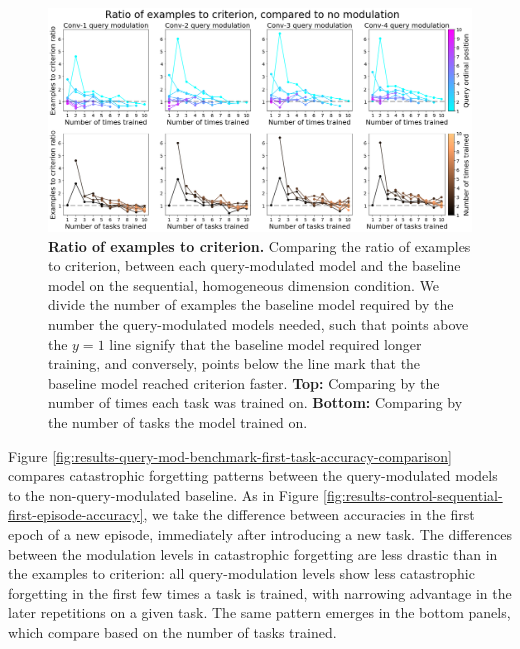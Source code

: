 \begin{figure}[!htb]
\centering
\includegraphics[width=\linewidth]{ch-results/figures/query_mod_benchmark/examples_to_criterion_comparison.png}
\caption[Ratio of examples to criterion.]{ {\bf Ratio of examples to criterion.} Comparing the ratio of examples to criterion, between each query-modulated model and the baseline model on the sequential, homogeneous dimension condition. We divide the number of examples the baseline model required by the number the query-modulated models needed, such that points above the $y=1$ line signify that the baseline model required longer training, and conversely, points below the line mark that the baseline model reached criterion faster. \textbf{Top:} Comparing by the number of times each task was trained on. \textbf{Bottom:} Comparing by the number of tasks the model trained on.}
\label{fig:results-query-mod-benchmark-examples-to-criterion-comparison}
\end{figure}

Figure \ref{fig:results-query-mod-benchmark-first-task-accuracy-comparison} compares catastrophic forgetting patterns between the query-modulated models to the non-query-modulated baseline. As in Figure \ref{fig:results-control-sequential-first-episode-accuracy}, we take the difference between accuracies in the first epoch of a new episode, immediately after introducing a new task. The differences between the modulation levels in catastrophic forgetting are less drastic than in the examples to criterion: all query-modulation levels show less catastrophic forgetting in the first few times a task is trained, with narrowing advantage in the later repetitions on a given task. The same pattern emerges in the bottom panels, which compare based on the number of tasks trained.

